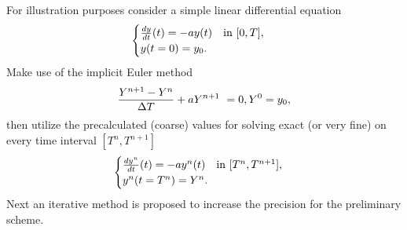 For illustration purposes consider a simple linear differential equation 
\begin{equation}
\begin{cases}
\frac{dy}{dt}(t) = -ay(t) \quad \textnormal{in}\ [0, T], \\
y(t=0) = y_0.
\end{cases}
\end{equation}
Make use of the implicit Euler method
\begin{equation}
\frac{Y^{n+1} - Y^{n}}{\Delta T} + aY^{n+1} = 0, \\
Y^0 = y_0,
\end{equation}
then utilize the precalculated (coarse) values for 
solving exact (or very fine) on every time interval $[T^n, T^{n+1}]$ 
\begin{equation}
\begin{cases}
\frac{dy^n}{dt}(t) = -ay^n(t)\quad \textnormal{in}\ [T^n, T^{n+1}], \\
y^n(t=T^n) = Y^n.
\end{cases}
\end{equation}
Next an iterative method is proposed to increase 
the precision for the preliminary scheme.

